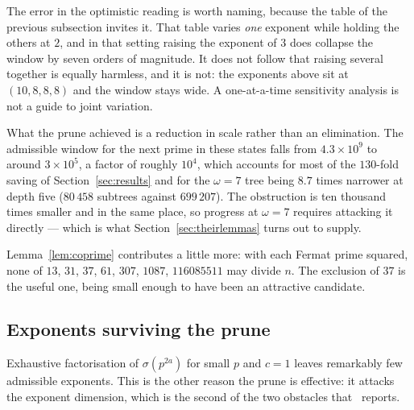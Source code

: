\documentclass[11pt]{amsart}
\theoremstyle{remark}
\begin{document}
The error in the optimistic reading is worth naming, because the table of the
previous subsection invites it. That table varies \emph{one} exponent while
holding the others at $2$, and in that setting raising the exponent of $3$ does
collapse the window by seven orders of magnitude. It does not follow that raising
several together is equally harmless, and it is not: the exponents above sit at
$(10,8,8,8)$ and the window stays wide. A one-at-a-time sensitivity analysis is
not a guide to joint variation.

What the prune achieved is a reduction in scale rather than an elimination. The
admissible window for the next prime in these states falls from
$4.3 \times 10^{9}$ to around $3 \times 10^{5}$, a factor of roughly $10^{4}$,
which accounts for most of the $130$-fold saving of
Section~\ref{sec:results} and for the $\omega = 7$ tree being $8.7$ times
narrower at depth five ($80\,458$ subtrees against $699\,207$). The obstruction is
ten thousand times smaller and in the same place, so progress at $\omega = 7$
requires attacking it directly --- which is what
Section~\ref{sec:theirlemmas} turns out to supply.

Lemma~\ref{lem:coprime} contributes a little more: with each Fermat prime
squared, none of $13$, $31$, $37$, $61$, $307$, $1087$, $116085511$ may divide
$n$. The exclusion of $37$ is the useful one, being small enough to have been an
attractive candidate.

\subsection{Exponents surviving the prune}
Exhaustive factorisation of $\sigma(p^{2a})$ for small $p$ and $c = 1$ leaves
remarkably few admissible exponents. This is the other reason the prune is
effective: it attacks the exponent dimension, which is the second of the two
obstacles that~\cite{tty} reports.
\end{document}
